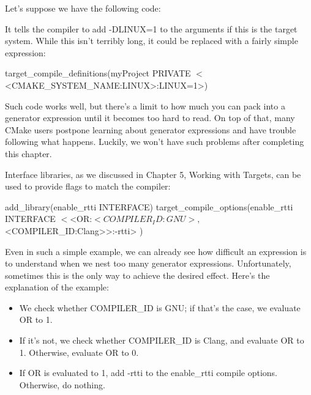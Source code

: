 Let’s suppose we have the following code:


It tells the compiler to add -DLINUX=1 to the arguments if this is the target system. While this isn’t terribly long, it could be replaced with a fairly simple expression:

\begin{cmake}
target_compile_definitions(myProject PRIVATE
                           $<$<CMAKE_SYSTEM_NAME:LINUX>:LINUX=1>)
\end{cmake}

Such code works well, but there’s a limit to how much you can pack into a generator expression until it becomes too hard to read. On top of that, many CMake users postpone learning about generator expressions and have trouble following what happens. Luckily, we won’t have such problems after completing this chapter.


Interface libraries, as we discussed in Chapter 5, Working with Targets, can be used to provide flags to match the compiler:

\begin{cmake}
add_library(enable_rtti INTERFACE)
target_compile_options(enable_rtti INTERFACE
    $<$<OR:$<COMPILER_ID:GNU>,$<COMPILER_ID:Clang>>:-rtti>
)
\end{cmake}

Even in such a simple example, we can already see how difficult an expression is to understand when we nest too many generator expressions. Unfortunately, sometimes this is the only way to achieve the desired effect. Here’s the explanation of the example:

\begin{itemize}
\item
We check whether COMPILER\_ID is GNU; if that’s the case, we evaluate OR to 1.

\item
If it’s not, we check whether COMPILER\_ID is Clang, and evaluate OR to 1. Otherwise, evaluate OR to 0.

\item
If OR is evaluated to 1, add -rtti to the enable\_rtti compile options. Otherwise, do nothing.
\end{itemize}

